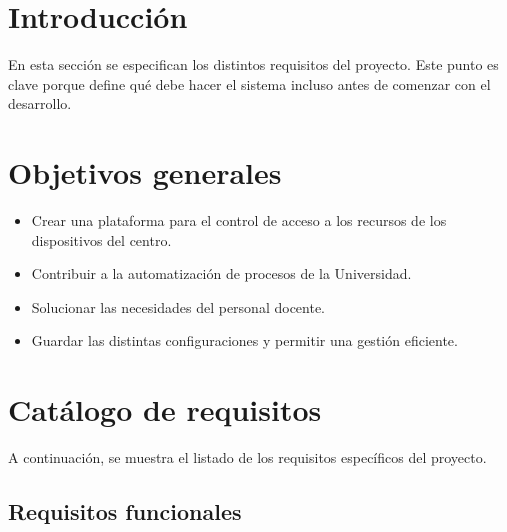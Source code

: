 
\section{Introducción}\label{sec:introduccion}

En esta sección se especifican los distintos requisitos del proyecto.
Este punto es clave porque define qué debe hacer el sistema incluso antes de comenzar con el desarrollo.

\section{Objetivos generales}\label{sec:objetivos-generales}

	\begin{itemize}
	\item Crear una plataforma para el control de acceso a los recursos de los dispositivos del centro.
	\item Contribuir a la automatización de procesos de la Universidad.
	\item Solucionar las necesidades del personal docente.
	\item Guardar las distintas configuraciones y permitir una gestión eficiente.
	\end{itemize}

\section{Catálogo de requisitos}\label{sec:catalogo-de-requisitos}

A continuación, se muestra el listado de los requisitos específicos del proyecto.

\subsection{Requisitos funcionales}\label{subsec:requisitos-funcionales}

